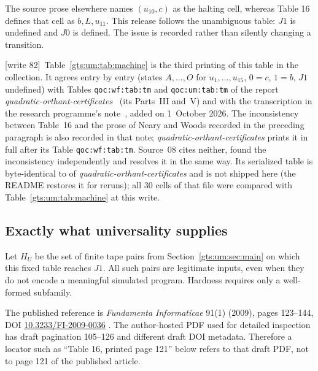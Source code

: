\documentclass[11pt,letterpaper]{article}
\theoremstyle{definition}
\theoremstyle{remark}
\newcommand{\wtagc}{\textup{[write 82]}}
\begin{document}
The source prose elsewhere names $(u_{10},c)$ as the halting cell, whereas Table 16 defines that cell as $b,L,u_{11}$. This release follows the unambiguous table: $J1$ is undefined and $J0$ is defined. The issue is recorded rather than silently changing a transition.

\wtagc\ Table~\ref{gts:um:tab:machine} is the third printing of this table in the collection. It agrees entry by entry (states $A,\ldots,O$ for $u_1,\ldots,u_{15}$, $0=c$, $1=b$, $J1$ undefined) with Tables \texttt{qoc:wf:tab:tm} and \texttt{qoc:um:tab:tm} of the report \emph{quadratic-orthant-certificates}~\cite{qoc} (its Parts~III and~V) and with the transcription in the research programme's note~\cite{repo-nw15}, added on 1~October 2026. The inconsistency between Table~16 and the prose of Neary and Woods recorded in the preceding paragraph is also recorded in that note; \emph{quadratic-orthant-certificates} prints it in full after its Table \texttt{qoc:wf:tab:tm}. Source~08 cites neither, found the inconsistency independently and resolves it in the same way. Its serialized table  is byte-identical to  of \emph{quadratic-orthant-certificates} and is not shipped here (the README restores it for reruns); all 30 cells of that file were compared with Table~\ref{gts:um:tab:machine} at this write.

\subsection{Exactly what universality supplies}
Let $H_U$ be the set of finite tape pairs from Section~\ref{gts:um:sec:main} on which this fixed table reaches $J1$. All such pairs are legitimate inputs, even when they do not encode a meaningful simulated program. Hardness requires only a well-formed subfamily.

The published reference is \emph{Fundamenta Informaticae} 91(1) (2009), pages 123--144, DOI \href{https://doi.org/10.3233/FI-2009-0036}{10.3233/FI-2009-0036} \cite{um-NW}. The author-hosted PDF used for detailed inspection has draft pagination 105--126 and different draft DOI metadata. Therefore a locator such as ``Table 16, printed page 121'' below refers to that draft PDF, not to page 121 of the published article.
\end{document}
